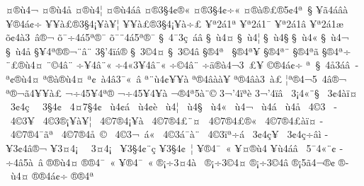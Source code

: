 {^^a4^^ae^^f94^^ac
^^a4^^ae^^f94^^e5
^^a4^^ae^^f94^^a6
^^a4^^ae^^f94^^e1^^e2
^^a4^^ae3^^a74^^a2^^ae^^ab
^^a4^^ae3^^a74^^a2^^f7^^ab
^^a4^^ae^^e0^^ae^^a3^^ae5^^a24^^aa^^a0^^a7
^^a5^^e34^^e1^^e2^^e0
^^a5^^ae4^^e1^^a2^^f7
^^a5^^ad^^a5^^e0^^a3^^ae3^^a74^^a1^^a5^^e0^^a5^^a6
^^a5^^ad^^a5^^e0^^a3^^ae3^^a74^^a1^^a5^^e0^^f7^^a3
^^a5^^aa2^^e11^^aa
^^a5^^aa2^^e11^^af
^^a5^^aa2^^e11^^e2
^^a5^^aa2^^e11^^e6
^^f5^^a24^^e03^^a0^^e2^^ae^^ac
^^f5^^af^^f74^^e15^^aa^^ae^^af
^^f5^^af^^a84^^e15^^aa^^ae^^af
^^a7^^a04^^af3^^e7^^a0^^e1^^e2
^^a7^^a0^^f94^^a4
^^a7^^a0^^f94^^a6
^^a7^^a0^^f94^^a7
^^a7^^a0^^f94^^ab
^^a7^^a0^^f94^^ac
^^a7^^a0^^f94^^e5
^^a7^^a54^^aa^^ae^^ad^^ae^^ac^^a8^^e2^^a8
3^^a7'4^^ef^^e1^^ae
^^a7^^ad^^a03^^a94^^a4
^^a7^^ad^^a03^^a94^^e2
^^a7^^ae4^^aa^^a0
^^a7^^ae4^^aa^^a5
^^a7^^ae4^^aa^^a8
^^a7^^ae4^^aa^^e3
^^a7^^ae4^^aa^^f7
^^a8^^a3^^ae^^f94^^a4
^^a8^^a94^^e2^^a8
^^f7^^a54^^e2^^a8^^ab
^^f74^^ab3^^a54^^e2^^a8^^ab
^^f7^^a94^^e2^^a8
^^f7^^ad^^e4^^ae^^e04^^ac3^^a0^^a3^^a5^^ad
^^a9^^ae4^^e1^^a2^^f7
^^aa^^a0^^a7^^a04^^e53^^e1^^e2^^a0^^ad
^^aa^^a2^^ae^^f94^^a4
^^aa^^ae^^e0^^ae^^f94^^a4
^^aa^^a2^^a0^^e04^^e23^^af^^ab^^a0^^e2
^^aa^^a8^^f94^^a2^^a5^^ad^^a5^^e0
^^aa^^ae^^ad4^^e2^^e0^^e0^^a5
^^aa^^ae^^ad4^^e2^^e03^^a0^^e0^^a3
^^a6^^aa^^ae4^^ac5^^a04^^e2^^ae^^ac
^^aa^^ae^^ac^^e34^^ad^^a5^^ad^^a5^^e0^^a3
^^ac^^f74^^ad5^^a54^^aa^^ae
^^ac^^f74^^ad5^^a54^^ad^^a5^^e0
^^ac^^ae4^^aa5^^e0^^a8^^a9
3^^ac'4^^ef^^aa^^e8
3^^ac'4^^ef^^e2
^^ad^^a03^^a14^^ab^^a8^^a7
^^ad^^a03^^a24^^e0^^ef^^a4
^^ad^^a03^^a24^^e7^^a0
^^ad^^a03^^a74^^a2
^^ad^^a04^^a47^^a74^^a2
^^ad^^a0^^f94^^a2^^e1
^^ad^^a0^^f94^^a2^^e8
^^ad^^a0^^f94^^a6
^^ad^^a0^^f94^^a7
^^ad^^a0^^f94^^ab
^^ad^^a0^^f94^^ac
^^ad^^a0^^f94^^e1
^^ad^^a0^^f94^^e5
^^ad^^a04^^a93^^a0
^^ad^^a04^^a93^^a5
^^ad^^a04^^a93^^ae^^a1^^a5^^e0^^a5^^a6
^^ad^^a04^^a97^^ae4^^a1^^a5^^e0
^^ad^^a04^^a97^^ae4^^a3^^a8^^a4
^^ad^^a04^^a97^^ae4^^a3^^ae^^ab
^^ad^^a04^^a97^^ae4^^a3^^e0^^ef^^a4
^^ad^^a04^^a97^^ae4^^af^^e3^^aa
^^ad^^a04^^a97^^ae4^^e5^^a0^^a9
^^ad^^a04^^a93^^ac^^a0^^e1^^ab
^^ad^^a04^^a93^^e1^^af^^e0^^a8
^^ad^^a04^^a93^^ef^^aa^^f7^^e1
^^ad^^a03^^a24^^e7^^a5^^ad
^^ad^^a03^^a24^^e7^^f7^^e2^^ec
^^ad^^a53^^a24^^e2^^ae^^ac
^^ad^^a53^^a44^^a1^^a0^^ad
^^ad^^a03^^a44^^a1^^a0^^ad
^^ad^^a53^^a74^^a2^^a8^^e7
^^ad^^a53^^a74^^a2^^a0^^a6
^^ad^^a5^^ae4^^af^^a0^^ab
^^ad^^a5^^a4^^ae^^f94
^^ad^^a5^^f94^^e1^^e2
^^ad^^a05^^af4^^ab^^a8^^a2
^^ad^^f74^^e25^^e0^^a0^^e2
^^ae^^ad^^ae^^f94^^a4
^^ae^^ae4^^af^^a0^^ab
^^a5^^ae4^^af^^a0^^ab
^^ae^^a1^^f73^^a44^^e0^^a0^^ad
^^ae^^a1^^f73^^a94^^a4
^^ae^^a1^^f73^^a94^^e2
^^ae^^a15^^e34^^ac^^ae^^a2
^^ae^^ad^^a0^^f94^^a4
^^ae^^ae4^^e1^^a2^^f7
^^ae^^ae4^^aa
}
